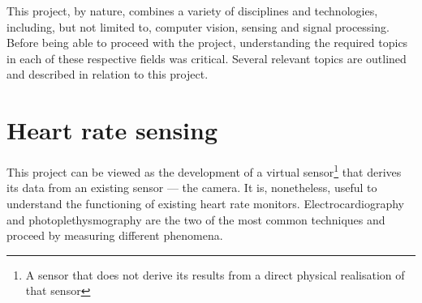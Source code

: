 This project, by nature, combines a variety of disciplines and technologies, including, but not limited to, computer vision, sensing and signal processing. 
Before being able to proceed with the project, understanding the required topics in each of these respective fields was critical. Several relevant topics are outlined 
and described in relation to this project.

\section{Heart rate sensing}
\label{prep:hr_sensing}
This project can be viewed as the development of a virtual sensor\footnote{A sensor that does not derive its results from a direct physical realisation of that sensor} that derives its data from an existing sensor --- the camera. 
It is, nonetheless, useful to understand the functioning of existing heart rate monitors.
Electrocardiography and photoplethysmography are the two of the most common techniques and proceed by measuring different phenomena.

